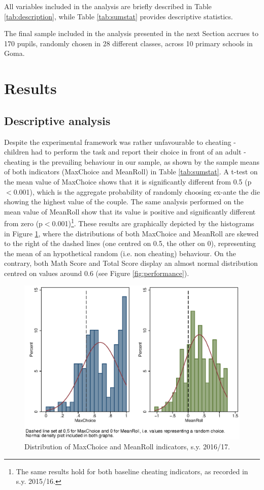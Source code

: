 \documentclass[authoryear, preprint, review, 12pt]{elsarticle}
\begin{document}
All variables included in the analysis are briefly described in Table \ref{tab:description}, while Table \ref{tab:sumstat} provides descriptive statistics. 




The final sample included in the analysis presented in the next Section accrues to 170 pupils, randomly chosen in 28 different classes, across 10 primary schools in Goma.

\section{Results}
\label{sec:results}

\subsection{Descriptive analysis}
\label{subsec:Descriptive}
Despite the experimental framework was rather unfavourable to cheating - children had to perform the task and report their choice in front of an adult - cheating is the prevailing behaviour in our sample, as shown by the sample means of both indicators (MaxChoice and MeanRoll) in Table \ref{tab:sumstat}. A t-test on the mean value of MaxChoice shows that it is significantly different from 0.5 (p$<$0.001), which is the aggregate probability of randomly choosing ex-ante the die showing the highest value of the couple. The same analysis performed on the mean value of MeanRoll show that its value is positive and significantly different from zero (p$<$0.001)\footnote{The same results hold for both baseline cheating indicators, as recorded in s.y. 2015/16.}.
These results are graphically depicted by the histograms in Figure \ref{fig:cheating}, where the distributions of both MaxChoice and MeanRoll are skewed to the right of the dashed lines (one centred on 0.5, the other on 0), representing the mean of an hypothetical random (i.e. non cheating) behaviour. On the contrary, both Math Score and Total Score display an almost normal distribution centred on values around 0.6 (see Figure \ref{fig:performance}).

\begin{figure}[!h]
  \centering
	\includegraphics[width=.8\linewidth]{figures/hist_meanrollANDmaxchoice.eps} \caption{Distribution of MaxChoice and MeanRoll indicators, s.y. 2016/17.}\label{fig:cheating}
\end{figure}
\end{document}
